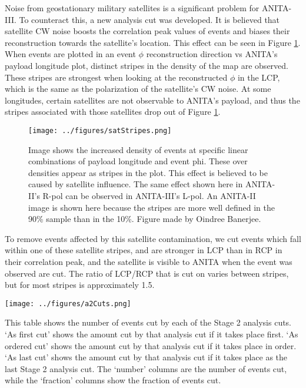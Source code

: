 Noise from geostationary military satellites is a significant problem for ANITA-III.  To counteract this, a new analysis cut was developed.  It is believed that satellite CW noise boosts the correlation peak values of events and biases their reconstruction towards the satellite's location.  This effect can be seen in Figure \ref{fig:satStripes}.  When events are plotted in an event $\phi$ reconstruction direction vs ANITA's payload longitude plot, distinct stripes in the density of the map are observed.  These stripes are strongest when looking at the reconstructed $\phi$ in the LCP, which is the same as the polarization of the satellite's CW noise.  At some longitudes, certain satellites are not observable to ANITA's payload, and thus the stripes associated with those satellites drop out of Figure \ref{fig:satStripes}.

\begin{figure}[h]
\centering
\texttt{[image: ../figures/satStripes.png]}
\caption[Satellite Stripes]{Image shows the increased density of events at specific linear combinations of payload longitude and event phi.  These over densities appear as stripes in the plot.  This effect is believed to be caused by satellite influence.  The same effect shown here in ANITA-II's R-pol can be observed in ANITA-III's L-pol. An ANITA-II image is shown here because the stripes are more well defined in the 90\% sample than in the 10\%.  Figure made by Oindree Banerjee.}
\label{fig:satStripes}
\end{figure}

To remove events affected by this satellite contamination, we cut events which fall within one of these satellite stripes, and are stronger in LCP than in RCP in their correlation peak, and the satellite is visible to ANITA when the event was observed are cut.  The ratio of LCP/RCP that is cut on varies between stripes, but for most stripes is approximately 1.5.

\begin{table}[h]
\centering
\texttt{[image: ../figures/a2Cuts.png]}
\caption[Stage 2 Analysis Cuts Table]{This table shows the number of events cut by each of the Stage 2 analysis cuts.  `As first cut' shows the amount cut by that analysis cut if it takes place first.  `As ordered cut' shows the amount cut by that analysis cut if it takes place in order.  `As last cut' shows the amount cut by that analysis cut if it takes place as the last Stage 2 analysis cut.  The `number' columns are the number of events cut, while the `fraction' columns show the fraction of events cut.}
\label{tab:a2cuts}
\end{table}

